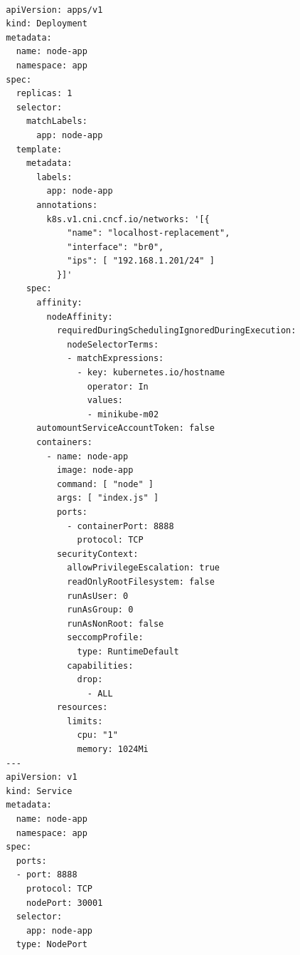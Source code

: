 \documentclass[english, 12pt, a4paper, sci, utf8, a-2b, online]{aaltothesis}
\begin{document}
\begin{lstlisting}[caption={Server's K8s deployment resource}]

  apiVersion: apps/v1
  kind: Deployment
  metadata:
    name: node-app
    namespace: app
  spec:
    replicas: 1
    selector:
      matchLabels:
        app: node-app
    template:
      metadata:
        labels:
          app: node-app
        annotations:
          k8s.v1.cni.cncf.io/networks: '[{
              "name": "localhost-replacement",
              "interface": "br0",
              "ips": [ "192.168.1.201/24" ]
            }]'
      spec:
        affinity:
          nodeAffinity:
            requiredDuringSchedulingIgnoredDuringExecution:
              nodeSelectorTerms:
              - matchExpressions:
                - key: kubernetes.io/hostname
                  operator: In
                  values:
                  - minikube-m02
        automountServiceAccountToken: false
        containers:
          - name: node-app
            image: node-app
            command: [ "node" ]
            args: [ "index.js" ]
            ports:
              - containerPort: 8888
                protocol: TCP
            securityContext:
              allowPrivilegeEscalation: true
              readOnlyRootFilesystem: false
              runAsUser: 0
              runAsGroup: 0
              runAsNonRoot: false
              seccompProfile:
                type: RuntimeDefault
              capabilities:
                drop:
                  - ALL
            resources:
              limits:
                cpu: "1"
                memory: 1024Mi
  ---
  apiVersion: v1
  kind: Service
  metadata:
    name: node-app
    namespace: app
  spec:
    ports:
    - port: 8888
      protocol: TCP
      nodePort: 30001
    selector:
      app: node-app
    type: NodePort
\end{lstlisting}

\clearpage
\end{document}
